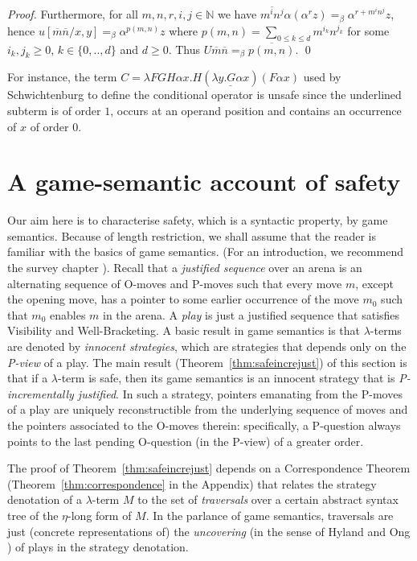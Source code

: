 \documentclass{llncs}
\newcommand{\encode}[1]{\overline{#1}} \newcommand\dps{\displaystyle}
\newcommand\nat{\mathbb{N}}
\begin{document}
\begin{proof}
Furthermore, for all $m,n,r,i,j\in \nat$
we have $\encode{m^i n^j} \alpha (\alpha^r z) =_\beta
\alpha^{r + m^i n^j} z$,
hence $u[\encode{m} \encode{n}/x,y] =_\beta \alpha^{p(m,n)} z$ where $p(m,n) = \sum_{0\leq k \leq d} m^{i_k} n^{j_k}$ for some $i_k,j_k \geq 0$, $k \in\{ 0,..,d \}$ and $d\geq 0$.
Thus $U \encode{m} \encode{n} =_\beta \encode{p(m,n)}$. \qed
\end{proof}

For instance, the term $ C = \lambda F G H \alpha x . H (
\underline{\lambda y . G \alpha x} ) (F \alpha x)$ used by
Schwichtenburg \cite{citeulike:622637} to define the conditional
operator is unsafe since the underlined subterm is of order $1$,
occurs at an operand position and contains an occurrence of $x$ of
order $0$.


\section{A game-semantic account of safety}
\label{sec:gamesemaccount}
Our aim here is to characterise safety, which is a syntactic property,
by game semantics. Because of length restriction, we shall assume that
the reader is familiar with the basics of game semantics.  (For an
introduction, we recommend the survey chapter
\cite{ghicamccusker00}). Recall that a \emph{justified sequence} over
an arena is an alternating sequence of O-moves and P-moves such that
every move $m$, except the opening move, has a pointer to some earlier
occurrence of the move $m_0$ such that $m_0$ enables $m$ in the
arena. A \emph{play} is just a justified sequence that satisfies
Visibility and Well-Bracketing. A basic result in game semantics is
that $\lambda$-terms are denoted by \emph{innocent strategies}, which
are strategies that depends only on the \emph{P-view} of a play. The
main result (Theorem~\ref{thm:safeincrejust}) of this section is that
if a $\lambda$-term is safe, then its game semantics is an innocent
strategy that is \emph{P-incrementally justified}. In such a strategy,
pointers emanating from the P-moves of a play are uniquely
reconstructible from the underlying sequence of moves and the pointers
associated to the O-moves therein: specifically, a P-question always
points to the last pending O-question (in the P-view) of a greater
order.

The proof of Theorem~\ref{thm:safeincrejust} depends on a
Correspondence Theorem (Theorem~\ref{thm:correspondence} in the
Appendix) that relates the strategy denotation of a $\lambda$-term $M$
to the set of \emph{traversals} over a certain abstract syntax tree of
the $\eta$-long form of $M$. In the parlance of game semantics,
traversals are just (concrete representations of) the
\emph{uncovering} (in the sense of Hyland and Ong
\cite{hylandong_pcf}) of plays in the strategy denotation.
\end{document}
